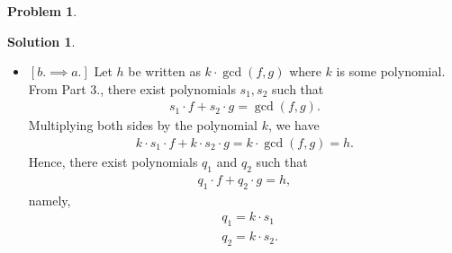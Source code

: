 \documentclass{article}
\theoremstyle{definition}
\newtheorem*{prob*}{Problem}
\newtheorem*{sln*}{Solution}
\begin{document}
\begin{prob*}
\begin{sln*}
\begin{enumerate}
\begin{itemize}
		\item $[b.\implies a.]$ Let $h$ be written as $k\cdot \gcd(f,g)$ where $k$ is some polynomial. From Part 3., there exist polynomials $s_1, s_2$ such that
		\begin{align*}
		s_1 \cdot f + s_2 \cdot g = \gcd(f,g).
		\end{align*}
		Multiplying both sides by the polynomial $k$, we have
		\begin{align*}
		k\cdot s_1 \cdot f + k \cdot s_2 \cdot g = k\cdot \gcd(f,g) = h.
		\end{align*}
		Hence, there exist polynomials $q_1$ and $q_2$ such that 
		\begin{align*}
		q_1 \cdot f + q_2 \cdot g = h,
		\end{align*}
		namely, 
		\begin{align*}
		&q_1 = k \cdot s_1\\
		&q_2 = k \cdot s_2.
		\end{align*}
	\end{itemize}


\end{enumerate}
\end{sln*}
\end{prob*}


\newpage
\end{document}
